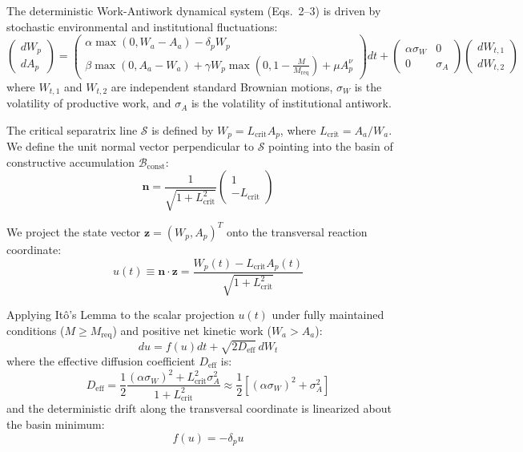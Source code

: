 \documentclass[preprint,12pt,authoryear]{elsarticle}
\theoremstyle{definition}
\begin{document}
The deterministic Work-Antiwork dynamical system (Eqs.~2--3) is driven by stochastic environmental and institutional fluctuations:
\begin{equation}
\begin{pmatrix} dW_p \\ dA_p \end{pmatrix} = \begin{pmatrix} \alpha \max(0, W_a - A_a) - \delta_p W_p \\ \beta \max(0, A_a - W_a) + \gamma W_p \max\left(0, 1 - \frac{M}{M_{\text{req}}}\right) + \mu A_p^\nu \end{pmatrix} dt + \begin{pmatrix} \alpha \sigma_W & 0 \\ 0 & \sigma_A \end{pmatrix} \begin{pmatrix} dW_{t,1} \\ dW_{t,2} \end{pmatrix} \label{eq:langevin_2d}
\end{equation}
where $W_{t,1}$ and $W_{t,2}$ are independent standard Brownian motions, $\sigma_W$ is the volatility of productive work, and $\sigma_A$ is the volatility of institutional antiwork.

The critical separatrix line $\mathcal{S}$ is defined by $W_p = L_{\text{crit}} A_p$, where $L_{\text{crit}} = A_a / W_a$. We define the unit normal vector perpendicular to $\mathcal{S}$ pointing into the basin of constructive accumulation $\mathcal{B}_{\text{const}}$:
\begin{equation}
\mathbf{n} = \frac{1}{\sqrt{1 + L_{\text{crit}}^2}} \begin{pmatrix} 1 \\ -L_{\text{crit}} \end{pmatrix} \label{eq:normal_vector}
\end{equation}

We project the state vector $\mathbf{z} = (W_p, A_p)^T$ onto the transversal reaction coordinate:
\begin{equation}
u(t) \equiv \mathbf{n} \cdot \mathbf{z} = \frac{W_p(t) - L_{\text{crit}} A_p(t)}{\sqrt{1 + L_{\text{crit}}^2}} \label{eq:transversal_coordinate}
\end{equation}

Applying It\^o's Lemma to the scalar projection $u(t)$ under fully maintained conditions ($M \ge M_{\text{req}}$) and positive net kinetic work ($W_a > A_a$):
\begin{equation}
du = f(u) dt + \sqrt{2 D_{\text{eff}}} \, dW_t \label{eq:sde_1d}
\end{equation}
where the effective diffusion coefficient $D_{\text{eff}}$ is:
\begin{equation}
D_{\text{eff}} = \frac{1}{2} \frac{(\alpha \sigma_W)^2 + L_{\text{crit}}^2 \sigma_A^2}{1 + L_{\text{crit}}^2} \approx \frac{1}{2} \left[ (\alpha \sigma_W)^2 + \sigma_A^2 \right] \label{eq:d_eff}
\end{equation}
and the deterministic drift along the transversal coordinate is linearized about the basin minimum:
\begin{equation}
f(u) = -\delta_p u \label{eq:drift_linear}
\end{equation}
\end{document}

